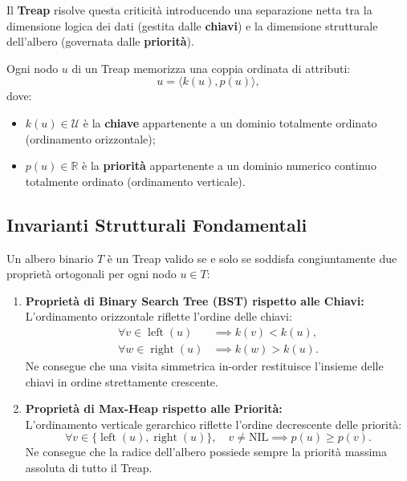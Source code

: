 Il \textbf{Treap} risolve questa criticit\`a introducendo una separazione netta tra la dimensione logica dei dati (gestita dalle \textbf{chiavi}) e la dimensione strutturale dell'albero (governata dalle \textbf{priorit\`a}).

\begin{definition}
Ogni nodo $u$ di un Treap memorizza una coppia ordinata di attributi:
\begin{equation}
  u = \langle k(u), p(u) \rangle,
\end{equation}
dove:
\begin{itemize}
    \item $k(u) \in \mathcal{U}$ \`e la \textbf{chiave} appartenente a un dominio totalmente ordinato (ordinamento orizzontale);
    \item $p(u) \in \mathbb{R}$ \`e la \textbf{priorit\`a} appartenente a un dominio numerico continuo totalmente ordinato (ordinamento verticale).
\end{itemize}
\end{definition}

\FloatBarrier
\subsection{Invarianti Strutturali Fondamentali}
Un albero binario $T$ \`e un Treap valido se e solo se soddisfa congiuntamente due propriet\`a ortogonali per ogni nodo $u \in T$:

\begin{enumerate}
    \item \textbf{Propriet\`a di Binary Search Tree (BST) rispetto alle Chiavi:}\\
    L'ordinamento orizzontale riflette l'ordine delle chiavi:
    \begin{align}
      \forall v \in \operatorname{left}(u)  &\implies k(v) < k(u), \\
      \forall w \in \operatorname{right}(u) &\implies k(w) > k(u).
    \end{align}
    Ne consegue che una visita simmetrica in-order restituisce l'insieme delle chiavi in ordine strettamente crescente.

    \item \textbf{Propriet\`a di Max-Heap rispetto alle Priorit\`a:}\\
    L'ordinamento verticale gerarchico riflette l'ordine decrescente delle priorit\`a:
    \begin{equation}
      \forall v \in \{\operatorname{left}(u), \operatorname{right}(u)\}, \quad v \neq \text{NIL} \implies p(u) \ge p(v).
    \end{equation}
    Ne consegue che la radice dell'albero possiede sempre la priorit\`a massima assoluta di tutto il Treap.
\end{enumerate}

